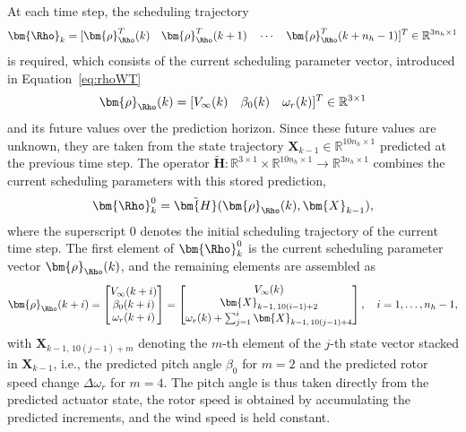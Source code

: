 At each time step, the scheduling trajectory
\begin{align*}
    \bm{\Rho}_{k} = [\bm{\rho}_{\Rho}^T(k) \quad \bm{\rho}_{\Rho}^T(k+1) \quad \cdots \quad \bm{\rho}_{\Rho}^T(k+n_h-1)]^T \in \mathbb{R}^{3n_h \times 1}
\end{align*}
is required, which consists of the current scheduling parameter vector, introduced in Equation~\ref{eq:rhoWT}
\begin{align*}
    \bm{\rho}_{\Rho}(k) = [V_\infty(k) \quad \beta_0(k) \quad \omega_r(k)]^T \in \mathbb{R}^{3 \times 1}
\end{align*}
and its future values over the prediction horizon. Since these future values are unknown, they are taken from the state trajectory $\bm{X}_{k-1} \in \mathbb{R}^{10 n_h \times 1}$ predicted at the previous time step. The operator $\tilde{\bm{H}}: \mathbb{R}^{3 \times 1} \times \mathbb{R}^{10 n_h \times 1} \to \mathbb{R}^{3 n_h \times 1}$ combines the current scheduling parameters with this stored prediction,
\begin{align*}
    \bm{\Rho}_k^0 = \tilde{\bm{H}}(\bm{\rho}_{\Rho}(k), \bm{X}_{k-1}),
\end{align*}
where the superscript $0$ denotes the initial scheduling trajectory of the current time step. The first element of $\bm{\Rho}_k^0$ is the current scheduling parameter vector $\bm{\rho}_{\Rho}(k)$, and the remaining elements are assembled as
\begin{align*}
    \bm{\rho}_{\Rho}(k+i) = \begin{bmatrix}
        V_\infty(k+i) \\
        \beta_{0}(k+i) \\
        \omega_r(k+i)
    \end{bmatrix} = \begin{bmatrix}
        V_\infty(k) \\
        \bm{X}_{k-1,\,10(i-1)+2} \\
        \omega_r(k) + \sum_{j=1}^{i} \bm{X}_{k-1,\,10(j-1)+4}
    \end{bmatrix}, \quad i = 1, \dots, n_h-1,
\end{align*}
with $\bm{X}_{k-1,\,10(j-1)+m}$ denoting the $m$-th element of the $j$-th state vector stacked in $\bm{X}_{k-1}$, i.e., the predicted pitch angle $\beta_0$ for $m = 2$ and the predicted rotor speed change $\Delta\omega_r$ for $m = 4$. The pitch angle is thus taken directly from the predicted actuator state, the rotor speed is obtained by accumulating the predicted increments, and the wind speed is held constant.

